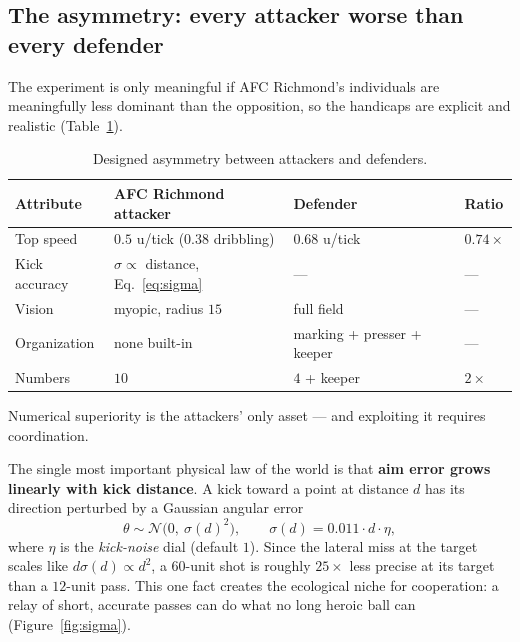 \documentclass[11pt,a4paper]{article}
\begin{document}
\subsection{The asymmetry: every attacker worse than every defender}

The experiment is only meaningful if AFC Richmond's individuals are meaningfully less dominant than
the opposition, so the handicaps are explicit and realistic (Table~\ref{tab:asym}).

\begin{table}[H]
\centering
\caption{Designed asymmetry between attackers and defenders.}
\label{tab:asym}
\small
\begin{tabular}{@{}llll@{}}
\toprule
\textbf{Attribute} & \textbf{AFC Richmond attacker} & \textbf{Defender} & \textbf{Ratio}\\
\midrule
Top speed & $0.5$ u/tick ($0.38$ dribbling) & $0.68$ u/tick & $0.74\times$\\
Kick accuracy & $\sigma \propto$ distance, Eq.~\eqref{eq:sigma} & --- & ---\\
Vision & myopic, radius $15$ & full field & ---\\
Organization & none built-in & marking + presser + keeper & ---\\
Numbers & $10$ & $4$ + keeper & $2\times$\\
\bottomrule
\end{tabular}

\smallskip
{\footnotesize Numerical superiority is the attackers' only asset --- and exploiting it requires coordination.}
\end{table}

The single most important physical law of the world is that \textbf{aim error grows linearly
with kick distance}. A kick toward a point at distance $d$ has its direction perturbed by a
Gaussian angular error
\begin{equation}\label{eq:sigma}
  \theta \sim \mathcal{N}\!\bigl(0,\ \sigma(d)^2\bigr), \qquad
  \sigma(d) = 0.011 \cdot d \cdot \eta,
\end{equation}
where $\eta$ is the \emph{kick-noise} dial (default $1$). Since the lateral miss at the target
scales like $d\sigma(d) \propto d^2$, a $60$-unit shot is roughly $25\times$ less precise at its
target than a $12$-unit pass. This one fact creates the ecological niche for cooperation: a relay
of short, accurate passes can do what no long heroic ball can (Figure~\ref{fig:sigma}).
\end{document}
